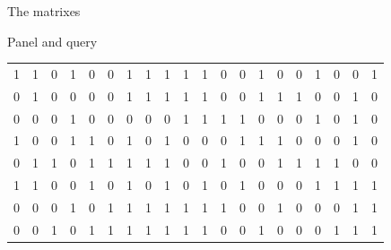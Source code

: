 \documentclass{beamer}
\begin{document}
\begin{frame}{The matrixes}
\begin{block}{Panel and query}
\begin{table}[H]
\begin{tabular}{c|c|c|c|c|c|c|c|c|c|c|c|c|c|c|c|c|c|c|c}
                    1 & 1 & 0 & 1 & 0 & 0 & 1 & 1 & 1 & 1 & 1 & 0 & 0 & 1 & 0 & 0 & 1 & 0
                                                                                                                                                                                                       & 0 & 1\\
                    0 & 1 & 0 & 0 & 0 & 0 & 1 & 1 & 1 & 1 & 1 & 0 & 0 & 1 & 1 & 1 & 0 & 0
                                                                                                                                                                                                       & 1 & 0\\
                    0 & 0 & 0 & 1 & 0 & 0 & 0 & 0 & 0 & 1 & 1 & 1 & 1 & 0 & 0 & 0 & 1 & 0
                                                                                                                                                                                                       & 1 & 0\\
                    1 & 0 & 0 & 1 & 1 & 0 & 1 & 0 & 1 & 0 & 0 & 0 & 1 & 1 & 1 & 0 & 0 & 0
                                                                                                                                                                                                       & 1 & 0\\
                    0 & 1 & 1 & 0 & 1 & 1 & 1 & 1 & 1 & 0 & 0 & 1 & 0 & 0 & 1 & 1 & 1 & 1
                                                                                                                                                                                                       & 0 & 0\\
                    1 & 1 & 0 & 0 & 1 & 0 & 1 & 0 & 1 & 0 & 1 & 0 & 1 & 0 & 0 & 0 & 1 & 1
                                                                                                                                                                                                       & 1 & 1\\
                    0 & 0 & 0 & 1 & 0 & 1 & 1 & 1 & 1 & 1 & 1 & 1 & 0 & 0 & 1 & 0 & 0 & 0
                                                                                                                                                                                                       & 1 & 1\\
                    \hline
                    \hline
                    \hline
                    0 & 0 & 1 & 0 & 1 & 1 & 1 & 1 & 1 & 1 & 1 & 0 & 0 & 1 & 0 & 0 & 0 & 1
                                                                                                                                                                                                       & 1 & 1

\end{tabular}
\end{table}
\end{block}
\end{frame}
\end{document}
